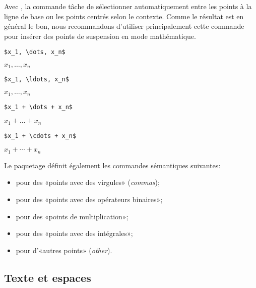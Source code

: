 Avec , la commande \cmd{\dots} tâche de sélectionner
automatiquement entre les points à la ligne de base ou les points
centrés selon le contexte. Comme le résultat est en général le bon,
nous recommandons d'utiliser principalement cette commande pour
insérer des points de suspension en mode mathématique.
\begin{demo}
  \begin{texample}
\begin{lstlisting}
$x_1, \dots, x_n$
\end{lstlisting}
    \producing $x_1, \dots, x_n$
  \end{texample}

  \begin{texample}
\begin{lstlisting}
$x_1, \ldots, x_n$
\end{lstlisting}
    \producing $x_1, \ldots, x_n$
  \end{texample}

  \begin{texample}
\begin{lstlisting}
$x_1 + \dots + x_n$
\end{lstlisting}
    \producing $x_1 + \dots + x_n$
  \end{texample}

  \begin{texample}
\begin{lstlisting}
$x_1 + \cdots + x_n$
\end{lstlisting}
    \producing $x_1 + \cdots + x_n$
  \end{texample}
\end{demo}
Le paquetage définit également les commandes sémantiques suivantes:
\begin{itemize}
\item \cmd{\dotsc} pour des «points avec des virgules» (\emph{commas});
\item \cmd{\dotsb} pour des «points avec des opérateurs binaires»;
\item \cmd{\dotsm} pour des «points de multiplication»;
\item \cmd{\dotsi} pour des «points avec des intégrales»;
\item \cmd{\dotso} pour d'«autres points» (\emph{other}).
\end{itemize}

\subsection{Texte et espaces}
\label{sec:math:bases:texte}

